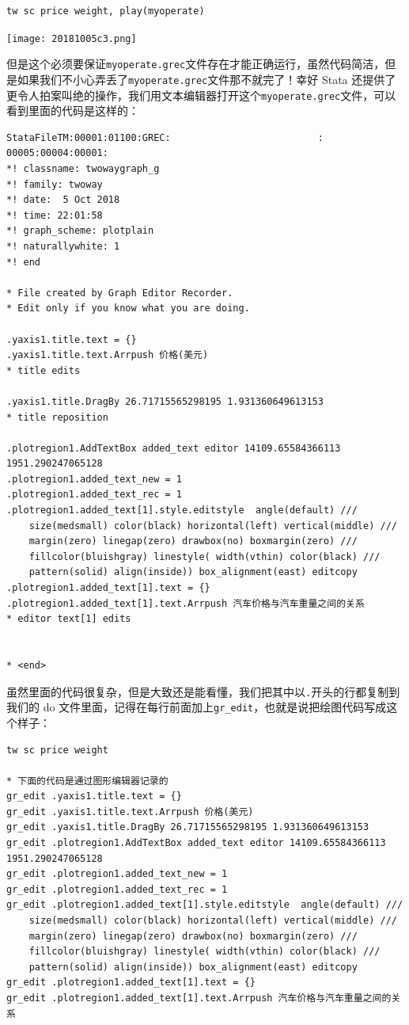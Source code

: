\documentclass[cn,fancy,blue,11pt]{elegantbook}
\begin{document}
\begin{lstlisting}
tw sc price weight, play(myoperate)
\end{lstlisting}

\noindent\texttt{[image: 20181005c3.png]}

但是这个必须要保证\lstinline{myoperate.grec}文件存在才能正确运行，虽然代码简洁，但是如果我们不小心弄丢了\lstinline{myoperate.grec}文件那不就完了！幸好 Stata 还提供了更令人拍案叫绝的操作，我们用文本编辑器打开这个\lstinline{myoperate.grec}文件，可以看到里面的代码是这样的：

\begin{lstlisting}
StataFileTM:00001:01100:GREC:                          :
00005:00004:00001:
*! classname: twowaygraph_g
*! family: twoway
*! date:  5 Oct 2018
*! time: 22:01:58
*! graph_scheme: plotplain
*! naturallywhite: 1
*! end

* File created by Graph Editor Recorder.
* Edit only if you know what you are doing.

.yaxis1.title.text = {}
.yaxis1.title.text.Arrpush 价格(美元)
* title edits

.yaxis1.title.DragBy 26.71715565298195 1.931360649613153
* title reposition

.plotregion1.AddTextBox added_text editor 14109.65584366113 1951.290247065128
.plotregion1.added_text_new = 1
.plotregion1.added_text_rec = 1
.plotregion1.added_text[1].style.editstyle  angle(default) ///
    size(medsmall) color(black) horizontal(left) vertical(middle) ///
    margin(zero) linegap(zero) drawbox(no) boxmargin(zero) ///
    fillcolor(bluishgray) linestyle( width(vthin) color(black) ///
    pattern(solid) align(inside)) box_alignment(east) editcopy
.plotregion1.added_text[1].text = {}
.plotregion1.added_text[1].text.Arrpush 汽车价格与汽车重量之间的关系
* editor text[1] edits


* <end>
\end{lstlisting}

虽然里面的代码很复杂，但是大致还是能看懂，我们把其中以\lstinline{.}开头的行都复制到我们的 do 文件里面，记得在每行前面加上\lstinline{gr_edit}，也就是说把绘图代码写成这个样子：

\begin{lstlisting}
tw sc price weight

* 下面的代码是通过图形编辑器记录的
gr_edit .yaxis1.title.text = {}
gr_edit .yaxis1.title.text.Arrpush 价格(美元)
gr_edit .yaxis1.title.DragBy 26.71715565298195 1.931360649613153
gr_edit .plotregion1.AddTextBox added_text editor 14109.65584366113 1951.290247065128
gr_edit .plotregion1.added_text_new = 1
gr_edit .plotregion1.added_text_rec = 1
gr_edit .plotregion1.added_text[1].style.editstyle  angle(default) ///
    size(medsmall) color(black) horizontal(left) vertical(middle) ///
    margin(zero) linegap(zero) drawbox(no) boxmargin(zero) ///
    fillcolor(bluishgray) linestyle( width(vthin) color(black) ///
    pattern(solid) align(inside)) box_alignment(east) editcopy
gr_edit .plotregion1.added_text[1].text = {}
gr_edit .plotregion1.added_text[1].text.Arrpush 汽车价格与汽车重量之间的关系
\end{lstlisting}
\end{document}
